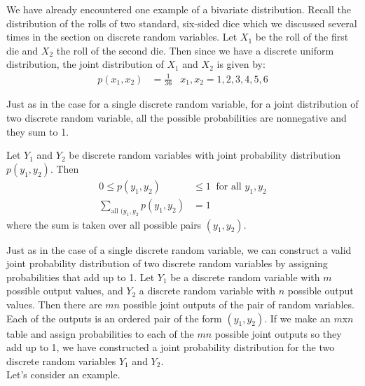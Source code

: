 \documentclass[notes.tex]{subfiles}
\begin{document}
We have already encountered one example of a bivariate distribution. Recall the distribution of the rolls of two standard, six-sided dice which we discussed several times in the section on discrete random variables. Let $X_1$ be the roll of the first die and $X_2$ the roll of the second die. Then since we have a discrete uniform distribution, the joint distribution of $X_1$ and $X_2$ is given by:
\begin{align*}
p(x_1, x_2) &= \frac{1}{36} & x_1, x_2 = 1, 2, 3, 4, 5, 6
\end{align*}

Just as in the case for a single discrete random variable, for a joint distribution of two discrete random variable, all the possible probabilities are nonnegative and they sum to 1.

\begin{framed}
Let $Y_1$ and $Y_2$ be discrete random variables with joint probability distribution $p(y_1, y_2)$. Then
\begin{align*}
0 \leq p(y_1, y_2) &\leq 1 \:\text{ for all }y_1, y_2 \\
\sum_{\text{all } (y_1, y_2} p(y_1, y_2) &= 1
\end{align*}
where the sum is taken over all possible pairs $(y_1, y_2)$.
\end{framed}

Just as in the case of a single discrete random variable, we can construct a valid joint probability distribution of two discrete random variables by assigning probabilities that add up to 1. Let $Y_1$ be a discrete random variable with $m$ possible output values, and $Y_2$ a discrete random variable with $n$ possible output values. Then there are $mn$ possible joint outputs of the pair of random variables. Each of the outputs is an ordered pair of the form $(y_1, y_2)$. If we make an $m$x$n$ table and assign probabilities to each of the $mn$ possible joint outputs so they add up to 1, we have constructed a joint probability distribution for the two discrete random variables $Y_1$ and $Y_2$.\\

Let's consider an example.
\end{document}
